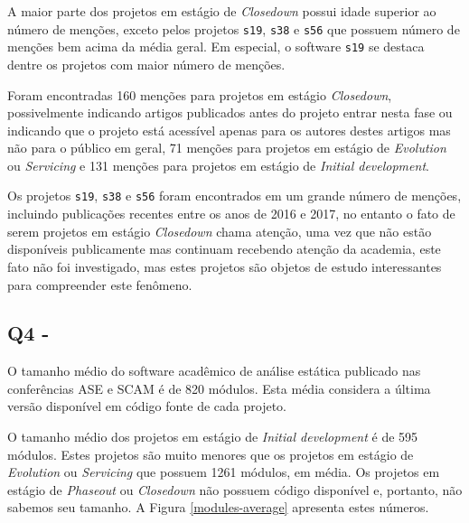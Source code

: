 A maior parte dos projetos em estágio de {\it Closedown} possui idade superior ao número
de menções, exceto pelos projetos \texttt{s19}, \texttt{s38} e
\texttt{s56} que possuem número de menções bem acima da média geral.
Em especial, o software \texttt{s19} se destaca dentre os projetos com maior número de menções.

Foram encontradas 160 menções para projetos em estágio {\it Closedown},
possivelmente indicando artigos publicados antes do projeto entrar nesta fase ou indicando que o projeto está acessível apenas para os autores destes artigos mas não para o público em geral,
71 menções para projetos em estágio de {\it Evolution} ou {\it Servicing} e 
131 menções para projetos em estágio de {\it Initial development}.

Os projetos \texttt{s19}, \texttt{s38} e \texttt{s56} foram encontrados em um
grande número de menções, incluindo publicações recentes entre os anos de 2016
e 2017, no entanto o fato de serem projetos em estágio {\it Closedown} chama
atenção, uma vez que não estão disponíveis publicamente mas continuam recebendo
atenção da academia, este fato não foi investigado, mas estes projetos são
objetos de estudo interessantes para compreender este fenômeno.


\subsection{Q4 - \QuestaoQuatro} %

O tamanho médio do software acadêmico de análise estática publicado nas
conferências ASE e SCAM é de 820 módulos. 
Esta média considera a última versão disponível em código fonte de cada projeto.

O tamanho médio dos projetos em estágio de {\it Initial development} é de 595
módulos. Estes projetos são muito menores que os projetos em estágio de {\it Evolution} 
ou  {\it Servicing} que possuem 1261 módulos, em média. 
Os projetos em estágio de {\it Phaseout} ou {\it Closedown} não possuem código disponível e,
portanto, não sabemos seu tamanho.
A Figura \ref{modules-average} apresenta estes números.

